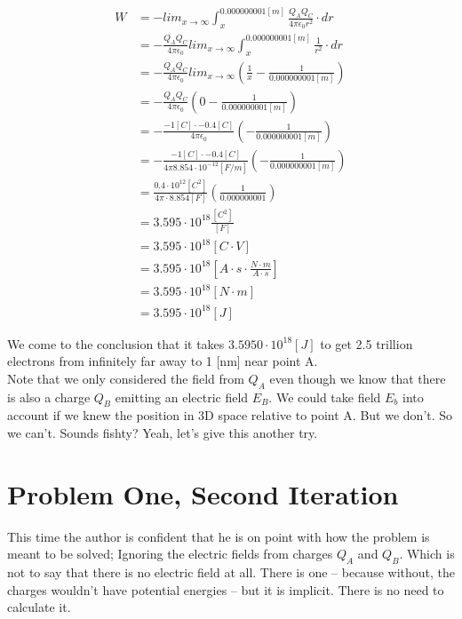 \documentclass[paper=a4, fontsize=11pt]{scrartcl} %
\numberwithin{equation}{section} %
\numberwithin{figure}{section} %
\numberwithin{table}{section} %
\begin{document}
\begin{align} \label{eq:8}
W &= - lim_{x\to\infty} \int_x^{0.000000001[m]}{\frac{Q_A Q_C}{4 \pi \epsilon_0 r^2}} \cdot dr \\
  &= - \frac{Q_A Q_C}{4 \pi \epsilon_0 } lim_{x\to\infty} \int_x^{0.000000001[m]}{\frac{1}{r^2}} \cdot dr \\
  &= - \frac{Q_A Q_C}{4 \pi \epsilon_0 } lim_{x\to\infty} \left( \frac{1}{x} - \frac{1}{0.000000001[m]} \right) \\
  &= - \frac{Q_A Q_C}{4 \pi \epsilon_0 } \left( 0 - \frac{1}{0.000000001[m]} \right) \\
  &= - \frac{-1[C] \cdot -0.4[C]}{4 \pi \epsilon_0 } \left( - \frac{1}{0.000000001[m]} \right) \\
  &= - \frac{-1[C] \cdot -0.4[C]}{4 \pi 8.854 \cdot 10 ^ {-12} [F/m] } \left( - \frac{1}{0.000000001[m]} \right) \\
  &= \frac{0.4 \cdot 10 ^ {12} [C^2]}{4 \pi \cdot 8.854 [F]} \left( \frac{1}{0.000000001} \right) \\
  &= 3.595 \cdot 10^{18} \frac{[C^2]}{[F]} \\
  &= 3.595 \cdot 10^{18} [C \cdot V] \\
  &= 3.595 \cdot 10^{18} \left[A \cdot s \cdot \frac{N \cdot m}{A \cdot s}\right] \\
  &= 3.595 \cdot 10^{18} [N \cdot m] \\
  &= 3.595 \cdot 10^{18} [J]
\end{align}

We come to the conclusion that it takes $3.5950 \cdot 10^{18} [J]$ to get 2.5 trillion electrons from infinitely far away
to 1 [nm] near point A. \\

Note that we only considered the field from $Q_A$ even though we know that there is also a charge
$Q_B$ emitting an electric field $E_B$. We could take field $E_b$ into account if we knew the position in 3D space relative to
point A. But we don't. So we can't. Sounds fishty? Yeah, let's give this another try.



\section{ Problem One, Second Iteration}
This time the author is confident that he is on point with
how the problem is meant to be solved; Ignoring the electric fields from charges $Q_A$ and $Q_B$.
Which is not to say that there is no electric field at all.
There is one -- because without, the charges wouldn't have potential energies -- but it is implicit. There is no need to calculate it. \\
\end{document}

